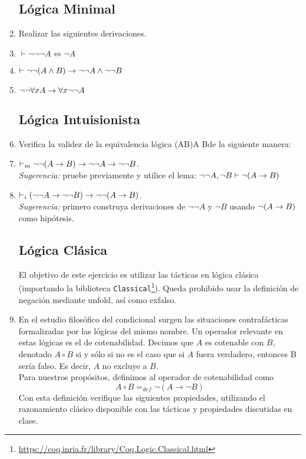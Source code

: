 \documentclass[letterpaper, 11 pt]{article}
\begin{document}
\begin{enumerate}
\subsection*{Lógica Minimal}
\item Realizar las siguientes derivaciones.
  \be
  \item $\vdash \neg\neg\neg A \iff \neg A$
  \item      $\vdash \neg\neg(A\land B)\rightarrow \neg\neg
   A\land\neg\neg B$
  \item $\neg\neg\forall x A\rightarrow \forall x \neg\neg A$
   \ee
   
\subsection*{Lógica Intuisionista}
 \item Verifica la validez de la
   equivalencia lógica \beqs\neg\neg(A\imp B)\iff \neg\neg A\imp\neg\neg
   B\eeqs de la siguiente manera:
   \be
    \item $\vdash_{m} \neg\neg(A\rightarrow B)\rightarrow\neg\neg A\rightarrow\neg\neg
   B$. \\ \emph{Sugerencia:} pruebe previamente y utilice el lema: 
   $\neg\neg A,\neg B\vdash \neg (A\rightarrow B)$
       \item $\vdash_{i}(\neg\neg A\rightarrow\neg\neg
   B)\rightarrow\neg\neg(A\rightarrow B)$. \\ \emph{Sugerencia:} primero construya
   derivaciones de $\neg\neg A$ y $\neg B$ usando $\neg(A\rightarrow B)$ como
   hipótesis.
    \ee

\subsection*{Lógica Clásica}

El objetivo de este ejercicio es utilizar las tácticas en lógica clásica (importando la biblioteca {\tt Classical}\footnote{\url{https://coq.inria.fr/library/Coq.Logic.Classical.html}}). Queda prohibido usar la definición de negación mediante unfold, así como exfalso.

\item En el estudio filosófico del condicional surgen las situaciones
contrafácticas formalizadas por las lógicas del mismo nombre. Un operador
relevante en estas lógicas es el de cotenabilidad. Decimos que $A$ es
cotenable con $B$, denotado $A\circ B$ si y sólo si no es el caso que si $A$
fuera verdadero, entonces B sería falso. Es decir, $A$ no excluye a $B$. \\
Para nuestros propósitos, definimos al operador de cotenabilidad como
\[
A\circ B =_{def} \neg (A\to \neg B)
\] 
Con esta definición verifique las siguientes propiedades, utilizando el razonamiento clásico disponible con las tácticas
y propiedades discutidas en clase.


\end{enumerate}
\end{document}
